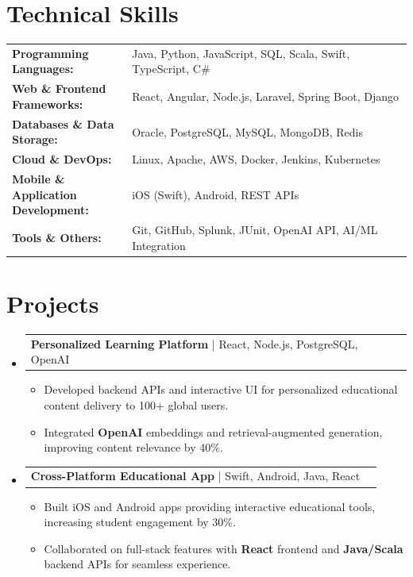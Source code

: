 \documentclass[letterpaper,10pt]{article}
\makeatletter
\newcommand{\resumeItem}[1]{
  \item{\fontsize{8pt}{9pt}\selectfont
    #1 \vspace{-3pt}
  }
}
\newcommand{\resumeProjectHeading}[2]{
    \item
    \begin{tabular*}{1.001\textwidth}{l@{\extracolsep{\fill}}r}
      \fontsize{8.5pt}{10pt}#1 & \textbf{\fontsize{8.5pt}{10pt} #2}\\
    \end{tabular*}\vspace{-7pt}
}
\newcommand{\resumeSubHeadingListStart}{\begin{itemize}[leftmargin=0pt, label={}]}
\newcommand{\resumeSubHeadingListEnd}{\end{itemize}}
\newcommand{\resumeItemListStart}{\begin{itemize}[leftmargin=*]}
\newcommand{\resumeItemListEnd}{\end{itemize}\vspace{-5pt}}
\makeatother
\begin{document}
\section{Technical Skills}
        \vspace{-14pt}
        \begin{table}[h]
            \fontsize{8pt}{9pt}\selectfont
            \begin{tabular}{p{0.3\linewidth} p{0.7\linewidth}}
                \textbf{Programming Languages:} & Java, Python, JavaScript, SQL, Scala, Swift, TypeScript, C\# \\
                \textbf{Web \& Frontend Frameworks:} & React, Angular, Node.js, Laravel, Spring Boot, Django \\
                \textbf{Databases \& Data Storage:} & Oracle, PostgreSQL, MySQL, MongoDB, Redis \\
                \textbf{Cloud \& DevOps:} & Linux, Apache, AWS, Docker, Jenkins, Kubernetes \\
                \textbf{Mobile \& Application Development:} & iOS (Swift), Android, REST APIs \\
                \textbf{Tools \& Others:} & Git, GitHub, Splunk, JUnit, OpenAI API, AI/ML Integration \\
            \end{tabular}
        \end{table}
 \vspace{-18pt}

\section{Projects}
    \vspace{-5pt}
    \resumeSubHeadingListStart
          \resumeProjectHeading
            {\textbf{Personalized Learning Platform} | React, Node.js, PostgreSQL, OpenAI}{}
            \resumeItemListStart
                \resumeItem{Developed backend APIs and interactive UI for personalized educational content delivery to 100+ global users.}
                \resumeItem{Integrated \textbf{OpenAI} embeddings and retrieval-augmented generation, improving content relevance by 40\%.}
            \resumeItemListEnd
        \vspace{-12pt}
    
        \resumeProjectHeading
            {\textbf{Cross-Platform Educational App} | Swift, Android, Java, React}{}
            \resumeItemListStart
                \resumeItem{Built iOS and Android apps providing interactive educational tools, increasing student engagement by 30\%.}
                \resumeItem{Collaborated on full-stack features with \textbf{React} frontend and \textbf{Java/Scala} backend APIs for seamless experience.}
        \resumeItemListEnd
    \resumeSubHeadingListEnd
\end{document}
